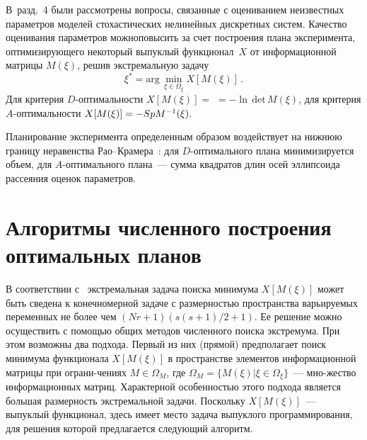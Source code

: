 \begin{multicols}{2}
  В~разд.~4 были рассмотрены вопросы, связанные с оцениванием
неизвестных параметров мо\-делей стохастических нелинейных дискретных
сис\-тем. Качество оценивания параметров можно\linebreak повысить за счет построения
плана эксперимента, оптимизирующего некоторый выпуклый функционал~$X$
от информационной матрицы $M(\xi)$, решив экстремальную задачу
  \begin{equation}
  \xi^* =\mathrm{arg}\,\min_{\xi\in\Omega_\xi} X[M(\xi)]\,.
  \label{e18-c}
  \end{equation}
Для критерия $D$-оп\-ти\-маль\-ности $X[M(\xi)] =$\linebreak
$=-\ln\,\mathrm{det}\,M(\xi)$,
для критерия $A$-оп\-ти\-маль\-ности $X[M(\xi)]\hm =-Sp M^{-1}(\xi)$.

  Планирование эксперимента определенным образом воздействует на
нижнюю границу неравенства Рао--Кра\-ме\-ра~\cite{20-c}: для
  $D$-оп\-ти\-маль\-но\-го плана минимизируется объем, для
  $A$-оп\-ти\-маль\-ного плана~--- сумма квадратов длин осей эллипсоида
рассеяния оценок параметров.

\vspace*{-6pt}

\section{Алгоритмы численного построения оптимальных планов}

\vspace*{-3pt}

  В соответствии с~\cite{21-c} экстремальная задача поиска минимума
$X[M(\xi)]$ может быть сведена к конечномерной задаче с размерностью
пространства варьируемых переменных не более чем $(Nr+1)(s(s+1)/2+1)$. Ее
решение можно осуществить с помощью общих методов численного поиска
экстремума. При этом возможны два подхода. 
Первый из них (прямой)
предполагает поиск минимума функционала $X[M(\xi)]$ в про\-стран\-ст\-ве
элементов информационной матрицы при ограни-\linebreak чениях $M\in\Omega_M$, где
$\Omega_M=\{M(\xi)\vert \xi\in\Omega_\xi\}$~--- мно-\linebreak жество информационных
матриц. Характерной осо\-бен\-ностью этого подхода является большая
размерность экстремальной задачи. Поскольку $X[M(\xi)]$~--- выпуклый
функционал, здесь имеет мес\-то задача выпуклого программирования, для
решения которой предлагается следующий алгоритм.

\vspace*{-4pt}


\end{multicols}

